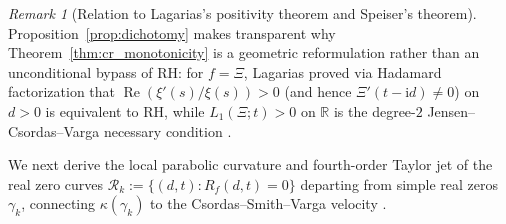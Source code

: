 \documentclass[11pt,a4paper,reqno]{amsart}
\theoremstyle{definition}
\theoremstyle{remark}
\newtheorem{remark}[theorem]{Remark}
\numberwithin{equation}{section}
\newcommand{\ii}{\mathrm{i}}
\newcommand{\Rea}{\operatorname{Re}}
\begin{document}
\begin{remark}[Relation to Lagarias's positivity theorem and Speiser's theorem]\label{rem:speiser_geo}
Proposition~\ref{prop:dichotomy} makes transparent why Theorem~\ref{thm:cr_monotonicity} is a geometric reformulation rather than an unconditional bypass of RH: for $f = \Xi$, Lagarias \cite[Theorem~1.1]{Lagarias1999} proved via Hadamard factorization that $\Rea(\xi'(s)/\xi(s)) > 0$ (and hence $\Xi'(t-\ii d) \neq 0$) on $d > 0$ is equivalent to RH, while $L_1(\Xi;t) > 0$ on $\mathbb{R}$ is the degree-$2$ Jensen--Csordas--Varga necessary condition \cite{Jensen1913,CsordasVarga1990}.
\end{remark}

We next derive the local parabolic curvature and fourth-order Taylor jet of the real zero curves $\mathcal{R}_k := \{(d,t) : R_f(d,t) = 0\}$ departing from simple real zeros $\gamma_k$, connecting $\kappa(\gamma_k)$ to the Csordas--Smith--Varga velocity \cite{CsordasSmithVarga1994}.
\end{document}

